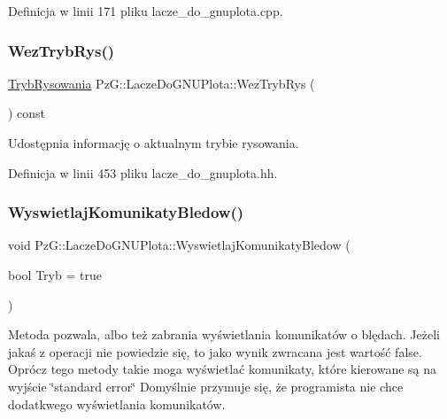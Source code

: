 Definicja w linii 171 pliku lacze\+\_\+do\+\_\+gnuplota.\+cpp.

\mbox{\label{class_pz_g_1_1_lacze_do_g_n_u_plota_a7c417f27b4b112f58a5be3ce6ea8d1fe}} 
\subsubsection{\texorpdfstring{WezTrybRys()}{WezTrybRys()}}
{\footnotesize\ttfamily \mbox{\hyperlink{namespace_pz_g_aeedae1ef10c66d720f9e89de408ca4ca}{Tryb\+Rysowania}} Pz\+G\+::\+Lacze\+Do\+G\+N\+U\+Plota\+::\+Wez\+Tryb\+Rys (\begin{DoxyParamCaption}{ }\end{DoxyParamCaption}) const\hspace{0.3cm}{\ttfamily [inline]}}

Udostępnia informację o aktualnym trybie rysowania. 

Definicja w linii 453 pliku lacze\+\_\+do\+\_\+gnuplota.\+hh.

\mbox{\label{class_pz_g_1_1_lacze_do_g_n_u_plota_a4531e6d166faf2e2c8bb4a54a9c9e1f8}} 
\subsubsection{\texorpdfstring{WyswietlajKomunikatyBledow()}{WyswietlajKomunikatyBledow()}}
{\footnotesize\ttfamily void Pz\+G\+::\+Lacze\+Do\+G\+N\+U\+Plota\+::\+Wyswietlaj\+Komunikaty\+Bledow (\begin{DoxyParamCaption}\item[{bool}]{Tryb = {\ttfamily true} }\end{DoxyParamCaption})}

Metoda pozwala, albo też zabrania wyświetlania komunikatów o blędach. Jeżeli jakaś z operacji nie powiedzie się, to jako wynik zwracana jest wartość {\ttfamily false}. Oprócz tego metody takie moga wyświetlać komunikaty, które kierowane są na wyjście \char`\"{}standard error\char`\"{} Domyślnie przymuje się, że programista nie chce dodatkwego wyświetlania komunikatów. 

